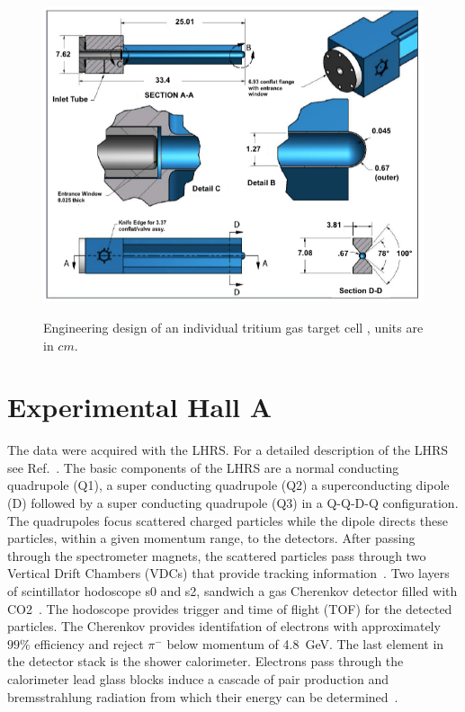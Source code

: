 \documentclass[final,5p,times,twocolumn]{elsarticle}
\begin{document}
\begin{figure}[!h]
\centering
  \includegraphics[width=13cm]{images/tritium_cell.jpg}\\
  \caption{Engineering design of an individual tritium gas target cell \cite{celldes}, units are in $cm$.
 }\label{cell}
\end{figure}


\section{Experimental Hall A}

The data were acquired with the LHRS. For a detailed description of the LHRS see Ref.~\cite{Alcorn:2004sb}. The basic components of the LHRS 
are a normal conducting quadrupole (Q1), a super conducting quadrupole (Q2) a superconducting dipole (D) followed by a super conducting 
quadrupole (Q3) in a Q-Q-D-Q configuration. The quadrupoles focus scattered charged particles while the dipole directs these particles, 
within a given momentum range, to the detectors. After passing through the spectrometer magnets, the scattered particles pass through 
two Vertical Drift Chambers (VDCs) that provide tracking information~\cite{Fissum:2001st}. 
Two layers of scintillator hodoscope s0 and s2, sandwich a gas 
Cherenkov detector filled with CO2~\cite{Iodice:1998ft}.  The hodoscope provides trigger and time of flight (TOF) for the detected particles.  
The Cherenkov provides identifation of electrons with approximately $99\%$ efficiency and reject $\pi^{-}$ below momentum of 4.8~GeV.  
The last element in the detector stack is the shower calorimeter. Electrons pass through the calorimeter lead glass blocks 
induce a cascade of pair production and bremsstrahlung radiation from which their energy can be determined~\cite{Alcorn:2004sb}.
\end{document}
